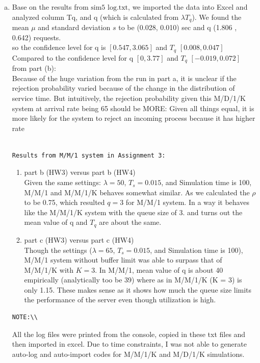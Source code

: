 \documentclass{article}   	                         %
\begin{document}
\begin{enumerate}[(a)]
\item
Base on the results from $\text {sim5 log.txt}$, we imported the data into Excel and analyzed column Tq, and q (which is calculated from $\lambda T_q$). We found the mean $\mu$ and standard deviation $s$ to be (0.028, 0.010) sec and q (1.806 , 0.642) requests.\\
so the confidence level for q is $[0.547, 3.065]$ and $T_q$ $[0.008, 0.047]$\\
Compared to the confidence level for q $[0, 3.77]$ and $T_q$ $[-0.019, 0.072]$ from part (b):\\
Because of the huge variation from the run in part a, it is unclear if the rejection probability varied because of the change in the distribution of service time. But intuitively, the rejection probability given this M/D/1/K system at arrival rate being 65 should be MORE: Given all things equal, it is more likely for the system to reject an incoming process because it has higher rate 
\\
\\
\begin{BVerbatim}
Results from M/M/1 system in Assignment 3:
\end{BVerbatim}
\begin{enumerate}
\item part b (HW3) versus part b (HW4)\\
Given the same settings: $\lambda = 50$, $T_s = 0.015$, and Simulation time is 100, M/M/1 and M/M/1/K behaves somewhat similar. As we calculated the $\rho$ to be 0.75, which resulted $q = 3$ for M/M/1 system. In a way it behaves like the M/M/1/K system with the queue size of 3. and turns out the mean value of q and $T_q$ are about the same.
\item part c (HW3) versus part c (HW4)\\
Though the settings ($\lambda = 65$, $T_s = 0.015$, and Simulation time is 100), M/M/1 system without buffer limit was able to surpass that of M/M/1/K with $K = 3$. In M/M/1, mean value of q is about 40 empirically (analytically too be 39) where as in M/M/1/K (K = 3) is only 1.15. These makes sense as it shows how much the queue size limits the performance of the server even though utilization is high.\\

\end{enumerate}
\begin{BVerbatim}
NOTE:\\
\end{BVerbatim}
All the log files were printed from the console, copied in these txt files and then imported in excel. Due to time constraints, I was not able to generate auto-log and auto-import codes for M/M/1/K and M/D/1/K simulations.\\

\end{enumerate}
\end{document}

